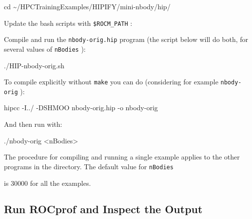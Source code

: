 \documentclass[
]{article}
\let\oldtexttt\texttt
\renewcommand{\texttt}[1]{
  \colorbox{Light}{\oldtexttt{#1}}
}
\newenvironment{Shaded}{}{}
\newcommand{\BuiltInTok}[1]{#1}
\newcommand{\ExtensionTok}[1]{#1}
\newcommand{\FunctionTok}[1]{\textcolor[rgb]{0.02,0.16,0.49}{#1}}
\newcommand{\NormalTok}[1]{#1}
\newcommand{\OperatorTok}[1]{\textcolor[rgb]{0.40,0.40,0.40}{#1}}
\newcommand{\StringTok}[1]{\textcolor[rgb]{0.25,0.44,0.63}{#1}}
\begin{document}
\begin{Shaded}
\begin{Highlighting}[]
\BuiltInTok{cd}\NormalTok{ \textasciitilde{}/HPCTrainingExamples/HIPIFY/mini{-}nbody/hip/}
\end{Highlighting}
\end{Shaded}

Update the bash scripts with \texttt{\$ROCM\_PATH}:

\begin{Shaded}
\end{Shaded}

Compile and run the \texttt{nbody-orig.hip} program (the script below
will do both, for several values of \texttt{nBodies}):

\begin{Shaded}
\begin{Highlighting}[]
\ExtensionTok{./HIP{-}nbody{-}orig.sh}
\end{Highlighting}
\end{Shaded}

To compile explicitly without \texttt{make} you can do (considering for
example \texttt{nbody-orig}):

\begin{Shaded}
\begin{Highlighting}[]
\ExtensionTok{hipcc}\NormalTok{ {-}I../ {-}DSHMOO nbody{-}orig.hip {-}o nbody{-}orig}
\end{Highlighting}
\end{Shaded}

And then run with:

\begin{Shaded}
\begin{Highlighting}[]
\ExtensionTok{./nbody{-}orig} \OperatorTok{\textless{}}\NormalTok{nBodies}\OperatorTok{\textgreater{}}
\end{Highlighting}
\end{Shaded}

The procedure for compiling and running a single example applies to the
other programs in the directory. The default value for \texttt{nBodies}
is 30000 for all the examples.

\hypertarget{run-rocprof-and-inspect-the-output}{%
\subsection{Run ROCprof and Inspect the
Output}\label{run-rocprof-and-inspect-the-output}}
\end{document}

